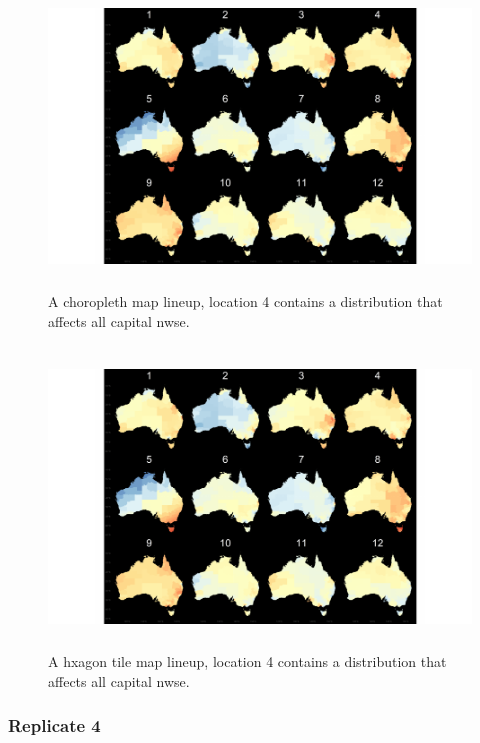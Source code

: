 \documentclass{monashthesis}
\begin{document}
\begin{figure}[H]
\centering
\includegraphics[height=8cm]{lineups/nwse-geo5-1.pdf}
\caption{\label{fig:nwse-geo5}A choropleth map lineup, location 4 contains a distribution that affects all capital nwse.}
\end{figure}

\begin{figure}[H]
\centering
\includegraphics[height=8cm]{lineups/nwse-hex5-1.pdf}
\caption{\label{fig:nwse-hex5}A hxagon tile map lineup, location 4 contains a distribution that affects all capital nwse.}
\end{figure}

\hypertarget{replicate-4-2}{%
\subsubsection{Replicate 4}\label{replicate-4-2}}
\end{document}
